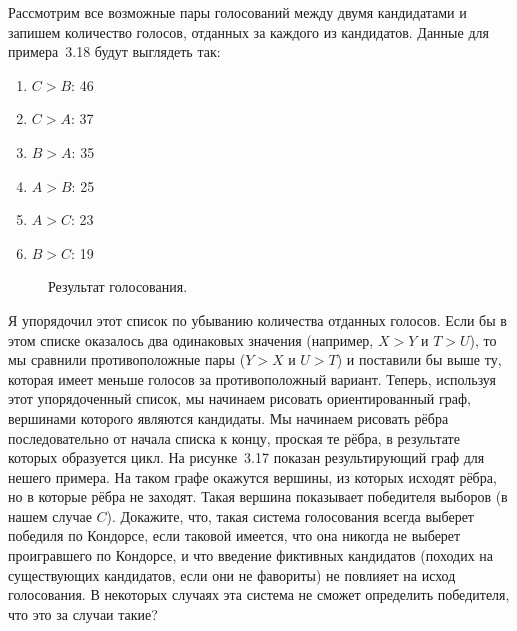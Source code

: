 \begin{exercise}
Рассмотрим все возможные пары голосований между двумя кандидатами и запишем количество голосов, отданных за каждого из кандидатов. Данные для примера~3.18 будут выглядеть так:
\begin{enumerate}
\item $C>B$: 46
\item $C>A$: 37
\item $B>A$: 35
\item $A>B$: 25
\item $A>C$: 23
\item $B>C$: 19
\end{enumerate}

\begin{figure}[h]
\centering
{}
\caption{Результат голосования.}
\end{figure}

Я упорядочил этот список по убыванию количества отданных голосов. Если бы в этом списке оказалось два одинаковых значения (например, $X>Y$ и $T>U$), то мы сравнили противоположные пары ($Y>X$ и $U>T$) и поставили бы выше ту, которая имеет меньше голосов за противоположный вариант. Теперь, используя этот упорядоченный список, мы начинаем рисовать ориентированный граф, вершинами которого являются кандидаты. Мы начинаем рисовать рёбра последовательно от начала списка к концу, проская те рёбра, в результате которых образуется цикл. На рисунке~3.17 показан результирующий граф для нешего примера. На таком графе окажутся вершины, из которых исходят рёбра, но в которые рёбра не заходят. Такая вершина показывает победителя выборов (в нашем случае $C$). Докажите, что, такая система голосования всегда выберет победиля по Кондорсе, если таковой имеется, что она никогда не выберет проигравшего по Кондорсе, и что введение фиктивных кандидатов (походих на существующих кандидатов, если они не фавориты) не повлияет на исход голосования. В некоторых случаях эта система не сможет определить победителя, что это за случаи такие?
\end{exercise}

